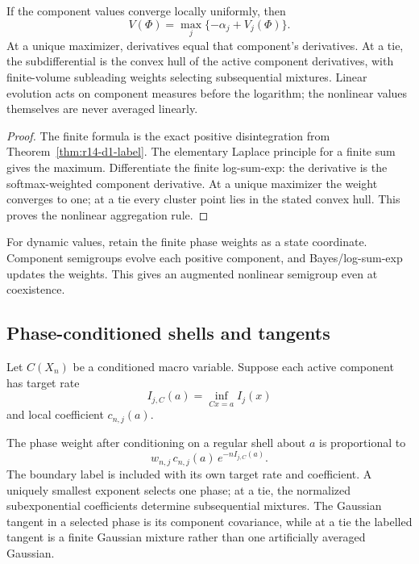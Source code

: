 \begin{theorem}
\label{thm:r14-d1-logsum}
If the component values converge locally uniformly, then
\[
 V(\Phi)=\max_j\{-\alpha_j+V_j(\Phi)\}.
\]
At a unique maximizer, derivatives equal that component's derivatives.  At a
tie, the subdifferential is the convex hull of the active component
derivatives, with finite-volume subleading weights selecting subsequential
mixtures.  Linear evolution acts on component measures before the logarithm;
the nonlinear values themselves are never averaged linearly.
\end{theorem}

\begin{proof}
The finite formula is the exact positive disintegration from
Theorem~\ref{thm:r14-d1-label}.  The elementary Laplace principle for a finite
sum gives the maximum.  Differentiate the finite log-sum-exp: the derivative
is the softmax-weighted component derivative.  At a unique maximizer the
weight converges to one; at a tie every cluster point lies in the stated
convex hull.  This proves the nonlinear aggregation rule.
\end{proof}

For dynamic values, retain the finite phase weights as a state coordinate.
Component semigroups evolve each positive component, and Bayes/log-sum-exp
updates the weights.  This gives an augmented nonlinear semigroup even at
coexistence.

\subsection{Phase-conditioned shells and tangents}

Let \(C(X_n)\) be a conditioned macro variable.  Suppose each active component
has target rate
\[
 I_{j,C}(a)=\inf_{Cx=a}I_j(x)
\]
and local coefficient \(c_{n,j}(a)\).

\begin{theorem}
\label{thm:r14-d1-shell}
The phase weight after conditioning on a regular shell about \(a\) is
proportional to
\[
 w_{n,j}\,c_{n,j}(a)\,e^{-nI_{j,C}(a)}.
\]
The boundary label is included with its own target rate and coefficient.
A uniquely smallest exponent selects one phase; at a tie, the normalized
subexponential coefficients determine subsequential mixtures.  The Gaussian
tangent in a selected phase is its component covariance, while at a tie the
labelled tangent is a finite Gaussian mixture rather than one artificially
averaged Gaussian.
\end{theorem}

